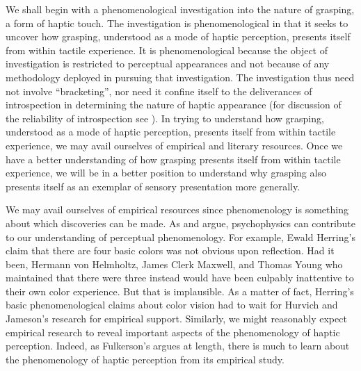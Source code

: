 We shall begin with a phenomenological investigation into the nature of grasping, a form of haptic touch. The investigation is phenomenological in that it seeks to uncover how grasping, understood as a mode of haptic perception, presents itself from within tactile experience. It is phenomenological because the object of investigation is restricted to perceptual appearances and not because of any methodology deployed in pursuing that investigation. The investigation thus need not involve ``bracketing'', nor need it confine itself to the deliverances of introspection in determining the nature of haptic appearance (for discussion of the reliability of introspection see \citealt{Schwitzgebel:2008aa,Bayne:2010ca}). In trying to understand how grasping, understood as a mode of haptic perception, presents itself from within tactile experience, we may avail ourselves of empirical and literary resources. Once we have a better understanding of how grasping presents itself from within tactile experience, we will be in a better position to understand why grasping also presents itself as an exemplar of sensory presentation more generally. 

We may avail ourselves of empirical resources since phenomenology is something about which discoveries can be made. As \citet{Hilbert:2007qy} and \citet{Phillips:2012af} argue, psychophysics can contribute to our understanding of perceptual phenomenology. For example, Ewald Herring’s claim that there are four basic colors was not obvious upon reflection. Had it been, Hermann von Helmholtz, James Clerk Maxwell, and Thomas Young who maintained that there were three instead would have been culpably inattentive to their own color experience. But that is implausible. As a matter of fact, Herring’s basic phenomenological claims about color vision had to wait for Hurvich and Jameson’s research for empirical support. Similarly, we might reasonably expect empirical research to reveal important aspects of the phenomenology of haptic perception. Indeed, as Fulkerson's \citeyearpar{Fulkerson:2014ek} argues at length, there is much to learn about the phenomenology of haptic perception from its empirical study.

